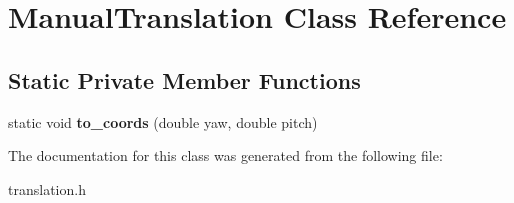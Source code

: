 \hypertarget{classManualTranslation}{}\section{Manual\+Translation Class Reference}
\label{classManualTranslation}
\subsection*{Static Private Member Functions}
\begin{DoxyCompactItemize}
\item 
\mbox{\label{classManualTranslation_a30730db174c38838524c5da363918df2}} 
static void {\bfseries to\+\_\+coords} (double yaw, double pitch)
\end{DoxyCompactItemize}


The documentation for this class was generated from the following file\+:\begin{DoxyCompactItemize}
\item 
translation.\+h\end{DoxyCompactItemize}

